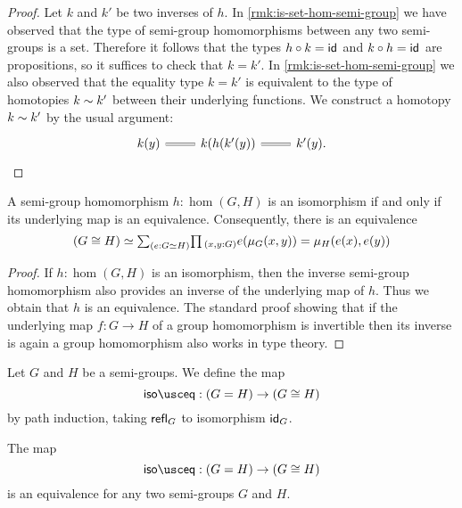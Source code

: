 \begin{proof}
  Let $k$ and $k'$ be two inverses of $h$. In \cref{rmk:is-set-hom-semi-group} we have observed that the type of semi-group homomorphisms between any two semi-groups is a set. Therefore it follows that the types $h\circ k=\idfunc$ and $k\circ h=\idfunc$ are propositions, so it suffices to check that $k=k'$. In \cref{rmk:is-set-hom-semi-group} we also observed that the equality type $k=k'$ is equivalent to the type of homotopies $k\htpy k'$ between their underlying functions. We construct a homotopy $k\htpy k'$ by the usual argument:
  \begin{equation*}
    \begin{tikzcd}
      k(y) \arrow[r,equals] & k(h(k'(y)) \arrow[r,equals] & k'(y).
    \end{tikzcd}\qedhere
  \end{equation*}
\end{proof}

\begin{lem}\label{lem:grp_iso}
  A semi-group homomorphism $h:\hom(G,H)$ is an isomorphism if and only if its underlying map is an equivalence. Consequently, there is an equivalence
  \begin{equation*}
    (G\cong H)\simeq \sm{e:G\simeq H}\prd{x,y:G}e(\mu_G(x,y))=\mu_H(e(x),e(y))
  \end{equation*}
\end{lem}

\begin{proof}
  If $h:\hom(G,H)$ is an isomorphism, then the inverse semi-group homomorphism also provides an inverse of the underlying map of $h$. Thus we obtain that $h$ is an equivalence. The standard proof showing that if the underlying map $f:G\to H$ of a group homomorphism is invertible then its inverse is again a group homomorphism also works in type theory.
\end{proof}

\begin{defn}
Let $G$ and $H$ be a semi-groups. We define the map
\begin{equation*}
\isoeq : (G=H)\to (G\cong H)
\end{equation*}
by path induction, taking $\refl{G}$ to isomorphism $\idfunc[G]$.
\end{defn}

\begin{thm}\label{thm:iso-eq-semi-group}
The map
\begin{equation*}
\isoeq : (G=H)\to (G\cong H)
\end{equation*}
is an equivalence for any two semi-groups $G$ and $H$.
\end{thm}

